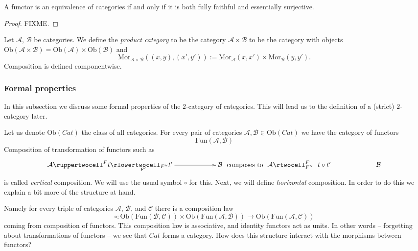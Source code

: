 \begin{lemma}
A functor is an equivalence of categories if and only if it is both fully
faithful and essentially surjective.
\end{lemma}

\begin{proof} FIXME. \end{proof}

\begin{definition}
\label{definition-product-category}
Let $\mathcal{A}$, $\mathcal{B}$ be categories.
We define the {\it product category} to be the category
$\mathcal{A}\times \mathcal{B}$ to be the category with
objects
$\text{Ob}(\mathcal{A}\times \mathcal{B}) =
\text{Ob}(\mathcal{A}) \times \text{Ob}(\mathcal{B})$
and 
$$
\text{Mor}_{\mathcal{A}\times \mathcal{B}}((x,y), (x',y'))
:=
\text{Mor}_{\mathcal{A}}(x, x')\times
\text{Mor}_{\mathcal{B}}(y, y').
$$
Composition is defined componentwise.
\end{definition}

\subsubsection{Formal properties}
\label{subsubsection-formal-cat-cat}

\noindent
In this subsection we discuss some formal properties of the
$2$-category of categories. This will lead us to the definition
of a (strict) $2$-category later.

\medskip\noindent
Let us denote $\text{Ob}(\textit{Cat})$ the class of all categories.
For every pair of categories
$\mathcal{A}, \mathcal{B} \in \text{Ob}(\textit{Cat})$
we have the category of functors
$$
\text{Fun}(\mathcal{A}, \mathcal{B})
$$
Composition of transformation of functors 
such as
$$
\xymatrixcolsep{5pc}
\xymatrix{
\mathcal{A}
\ruppertwocell^F{t}
\ar[r]_(.3){F'}
\rlowertwocell_{F''}{t'}
&
\mathcal{B}
}
\text{ composes to }
\xymatrix{
\mathcal{A}
\rtwocell^F_{F''}{\ \ t \circ t'}
&
\mathcal{B}
}
$$
is called {\it vertical} composition. We will use the usual
symbol $\circ$ for this. Next, we will define {\it horizontal}
composition. In order to do this we explain a bit more 
of the structure at hand.

\medskip\noindent
Namely for every triple
of categories $\mathcal{A}$, $\mathcal{B}$, and $\mathcal{C}$
there is a composition law
$$
\circ : \text{Ob}(\text{Fun}(\mathcal{B}, \mathcal{C}))
\times 
\text{Ob}(\text{Fun}(\mathcal{A}, \mathcal{B}))
\longrightarrow
\text{Ob}(\text{Fun}(\mathcal{A}, \mathcal{C}))
$$
coming from composition of functors. This composition law
is associative, and identity functors act as units. In other
words -- forgetting about transformations of functors --
we see that $\textit{Cat}$ forms a category. How does
this structure interact with the morphisms between functors?

